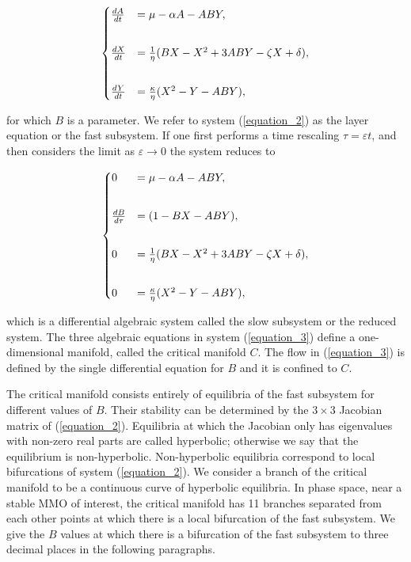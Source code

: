 \documentclass{ws-ijbc}
\begin{document}
\begin{equation}
\begin{aligned}
\begin{cases}
\frac{dA}{dt} &= \mu - \alpha A - ABY, \\ \vspace{2mm}\\
\frac{dX}{dt} &= \frac{1}{\eta}(BX - X^2 +3ABY - \zeta X + \delta), \\ \vspace{2mm}\\
\frac{dY}{dt} &= \frac{\kappa}{\eta}(X^2 - Y - ABY),
\end{cases}
\end{aligned}
\label{equation_2}
\end{equation}
    
\noindent
for which $B$ is a parameter.  We refer to system (\ref{equation_2}) as the layer equation or the fast subsystem.  If one first performs a time rescaling $\tau = \varepsilon t$, and then considers the limit as $\varepsilon \rightarrow 0$ the system reduces to
    
 \begin{equation}
\begin{aligned}
\begin{cases}
0 &= \mu - \alpha A - ABY, \\ \vspace{2mm}\\
\frac{dB}{d\tau} &= (1-BX - ABY), \\ \vspace{2mm}\\
0 &= \frac{1}{\eta}(BX - X^2 +3ABY - \zeta X + \delta), \\ \vspace{2mm}\\
0 &= \frac{\kappa}{\eta}(X^2 - Y - ABY),
\end{cases}
\end{aligned}
\label{equation_3}
\end{equation}
    
\noindent
which is a differential algebraic system called the slow subsystem or the reduced system. The three algebraic equations in system (\ref{equation_3}) define a one-dimensional manifold, called the critical manifold $C$.  The flow in (\ref{equation_3}) is defined by the single differential equation for $B$ and it is confined to $C$.  

The critical manifold consists entirely of equilibria of the fast subsystem for different values of $B$. Their stability can be determined by the $3\times3$ Jacobian matrix of (\ref{equation_2}).  Equilibria at which the Jacobian only has eigenvalues with non-zero real parts are called hyperbolic; otherwise we say that the equilibrium is non-hyperbolic.  Non-hyperbolic equilibria correspond to local bifurcations of system (\ref{equation_2}).  We consider a branch of the critical manifold to be a continuous curve of hyperbolic equilibria.  In phase space, near a stable MMO of interest, the critical manifold has 11 branches separated from each other points at which there is a local bifurcation of the fast subsystem.  We give the $B$ values at which there is a bifurcation of the fast subsystem to three decimal places in the following paragraphs.
\end{document}
